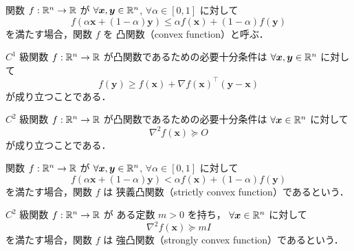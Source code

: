 \begin{definition}
    関数 $f : \mathbb{R}^n \to \mathbb{R}$ が
    $\forall \bm{x}, \bm{y} \in \mathbb{R}^n$, $\forall \alpha \in [0, 1]$ に対して
    \begin{equation}
        f\left(\alpha \bm{x} + (1-\alpha) \bm{y}\right)
        \le \alpha f(\bm{x}) + (1-\alpha) f(\bm{y})
    \end{equation}
    を満たす場合，関数 $f$ を  凸関数（convex function）と呼ぶ．
\end{definition}

\begin{theorem}
    $C^1$ 級関数 $f : \mathbb{R}^n \to \mathbb{R}$ が凸関数であるための必要十分条件は
    $\forall \bm{x}, \bm{y} \in \mathbb{R}^n$ に対して
    \begin{equation}
        f(\bm{y}) \ge f(\bm{x}) + \nabla f(\bm{x})^\top (\bm{y} - \bm{x})
    \end{equation}
    が成り立つことである．
\end{theorem}

\begin{theorem}
    $C^2$ 級関数 $f : \mathbb{R}^n \to \mathbb{R}$ が凸関数であるための必要十分条件は
    $\forall \bm{x} \in \mathbb{R}^n$ に対して
    \begin{equation}
        \nabla^2 f(\bm{x}) \succeq O
    \end{equation}
    が成り立つことである．
\end{theorem}

\begin{definition}
    関数 $f : \mathbb{R}^n \to \mathbb{R}$ が
    $\forall \bm{x}, \bm{y} \in \mathbb{R}^n$, $\forall \alpha \in [0, 1]$ に対して
    \begin{equation}
        f\left(\alpha \bm{x} + (1-\alpha) \bm{y}\right)
        < \alpha f(\bm{x}) + (1-\alpha) f(\bm{y})
    \end{equation}
    を満たす場合，関数 $f$ は
     狭義凸関数（strictly convex function）であるという．
\end{definition}

\begin{definition}
    $C^2$ 級関数 $f : \mathbb{R}^n \to \mathbb{R}$ が
    ある定数 $m > 0$ を持ち，
    $\forall \bm{x} \in \mathbb{R}^n$ に対して
    \begin{equation}
        \nabla^2 f(\bm{x}) \succeq m I
    \end{equation}
    を満たす場合，関数 $f$ は
     強凸関数（strongly convex function）であるという．
\end{definition}

